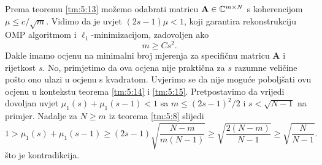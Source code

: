 \documentclass[a4paper,twoside,12pt]{memoir} %
\newcommand{\vect}[1]{\mathbf{#1}}
\renewcommand{\vec}{\vect}
\begin{document}
Prema teoremu \ref{tm:5:13} mo\v{z}emo odabrati matricu $\vec A \in \C^{m \times N}$ s koherencijom $\mu \leq c/\sqrt{m}$. Vidimo da je uvjet $(2s - 1)\mu < 1$, koji garantira rekonstrukciju OMP algoritmom i $\ell_1$-minimizacijom, zadovoljen ako
\begin{equation}\label{5:15}
    m \geq Cs^2.
\end{equation}
Dakle imamo ocjenu na minimalni broj mjerenja za specifi\v{c}nu matricu $\vec A$ i rijetkost $s$. No, primjetimo da ova ocjena nije prakti\v{c}na za $s$ razumne veli\v{c}ine po\v{s}to ono ulazi u ocjenu s kvadratom. Uvjerimo se da nije mogu\'ce pobolj\v{s}ati ovu ocjenu u kontekstu teorema \ref{tm:5:14} i \ref{tm:5:15}. Pretpostavimo da vrijedi dovoljan uvjet $\mu_1(s) + \mu_1(s-1) < 1$ sa $m  \leq (2s-1)^2/2$ i $s < \sqrt{N-1}$ na primjer. Nadalje za $N \geq m$ iz teorema \ref{tm:5:8} slijedi
\begin{equation*}
    1 > \mu_1(s) + \mu_1(s-1) \geq (2s-1) \sqrt{\frac{N-m}{m(N-1)}} \geq \sqrt{\frac{2(N-m)}{N-1}} \geq \sqrt{\frac{N}{N-1}}.
\end{equation*}
\v{s}to je kontradikcija.
\end{document}

